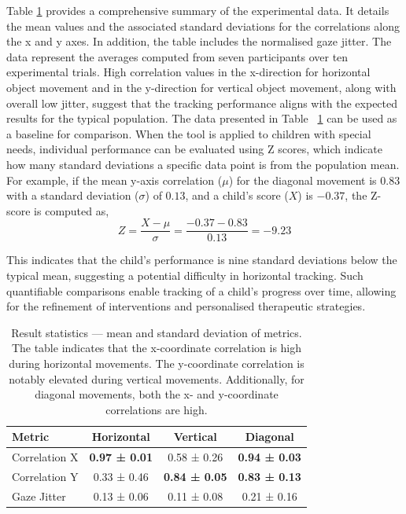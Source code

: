\documentclass[10pt,a4paper,twoside]{article}
\begin{document}
Table \ref{metr} provides a comprehensive summary of the experimental data. It details the mean values and the associated standard deviations for the correlations along the x and y axes. In addition, the table includes the normalised gaze jitter. The data represent the averages computed from seven participants over ten experimental trials. High correlation values in the x-direction for horizontal object movement and in the y-direction for vertical object movement, along with overall low jitter, suggest that the tracking performance aligns with the expected results for the typical population. The data presented in Table ~\ref{metr} can be used as a baseline for comparison. When the tool is applied to children with special needs, individual performance can be evaluated using Z scores, which indicate how many standard deviations a specific data point is from the population mean. For example, if the mean y-axis correlation ($\mu$) for the diagonal movement is $0.83$ with a standard deviation ($\sigma$) of $0.13$, and a child’s score ($X$) is $-0.37$, the Z-score is computed as,
\begin{equation}
     Z = \frac{X - \mu}{\sigma} = \frac{-0.37 - 0.83}{0.13} = -9.23
\end{equation}

This indicates that the child’s performance is nine standard deviations below the typical mean, suggesting a potential difficulty in horizontal tracking. Such quantifiable comparisons enable tracking of a child’s progress over time, allowing for the refinement of interventions and personalised therapeutic strategies.

\begin{table}[h!]
    \centering
    \begin{tabular}{lccc}
        \toprule
        Metric & Horizontal & Vertical & Diagonal \\
        \midrule
        Correlation X & \textbf{0.97 ± 0.01} & 0.58 ± 0.26 & \textbf{0.94 ± 0.03}\\
        Correlation Y & 0.33 ± 0.46 & \textbf{0.84 ± 0.05} & \textbf{0.83 ± 0.13}\\
        Gaze Jitter & 0.13 ± 0.06 & 0.11 ± 0.08 & 0.21 ± 0.16 \\
        \bottomrule
    \end{tabular}
     \caption{Result statistics — mean and standard deviation of metrics. The table indicates that the x-coordinate correlation is high during horizontal movements. The y-coordinate correlation is notably elevated during vertical movements. Additionally, for diagonal movements, both the x- and y-coordinate correlations are high.}
      \label{metr}
\end{table}
\end{document}
